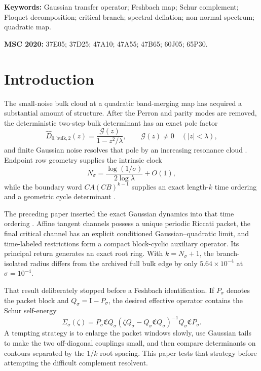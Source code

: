\documentclass[11pt]{article}
\theoremstyle{definition}
\theoremstyle{remark}
\newcommand{\Id}{\mathrm I}
\begin{document}
\noindent\textbf{Keywords:} Gaussian transfer operator; Feshbach map;
Schur complement; Floquet decomposition; critical branch; spectral
deflation; non-normal spectrum; quadratic map.

\medskip
\noindent\textbf{MSC 2020:} 37E05; 37D25; 47A10; 47A55; 47B65; 60J05;
65P30.

\section{Introduction}
\label{sec:introduction}

The small-noise bulk cloud at a quadratic band-merging map has acquired a
substantial amount of structure.  After the Perron and parity modes are
removed, the deterministic two-step bulk determinant has an exact pole
factor
\begin{equation}\label{eq:pole-factor}
 \widehat D_{0,\mathrm{bulk},2}(z)
 =\frac{\mathcal G(z)}{1-z^2/\lambda},
 \qquad \mathcal G(z)\ne0\quad(|z|<\lambda),
\end{equation}
and finite Gaussian noise resolves that pole by an increasing resonance
cloud \citep{WangBoundaryLayer2026,WangBulkScattering2026}.  Endpoint row
geometry supplies the intrinsic clock
\begin{equation}\label{eq:rank-clock}
 N_\sigma=\frac{\log(1/\sigma)}{2\log\lambda}+O(1),
\end{equation}
while the boundary word $CA(CB)^{k-1}$ supplies an exact length-$k$
time ordering and a geometric cycle determinant
\citep{WangEndpointRank2026,WangTimeOrdered2026}.

The preceding paper inserted the exact Gaussian dynamics into that time
ordering \citep{WangGaussianReturn2026}.  Affine tangent channels possess a
unique periodic Riccati packet, the final critical channel has an explicit
conditioned Gaussian--quadratic limit, and time-labeled restrictions form a
compact block-cyclic auxiliary operator.  Its principal return generates an
exact root ring.  With $k=N_\sigma+1$, the branch-isolated radius differs from
the archived full bulk edge by only $5.64\times10^{-4}$ at
$\sigma=10^{-4}$.

That result deliberately stopped before a Feshbach identification.  If
$P_\sigma$ denotes the packet block and $Q_\sigma=\Id-P_\sigma$, the desired
effective operator contains the Schur self-energy
\begin{equation}\label{eq:intro-self-energy}
 \Sigma_\sigma(\zeta)
 =P_\sigma\mathfrak C Q_\sigma
 (\zeta Q_\sigma-Q_\sigma\mathfrak C Q_\sigma)^{-1}
 Q_\sigma\mathfrak C P_\sigma.
\end{equation}
A tempting strategy is to enlarge the packet windows slowly, use Gaussian
tails to make the two off-diagonal couplings small, and then compare
determinants on contours separated by the $1/k$ root spacing.  This paper
tests that strategy before attempting the difficult complement resolvent.
\end{document}
